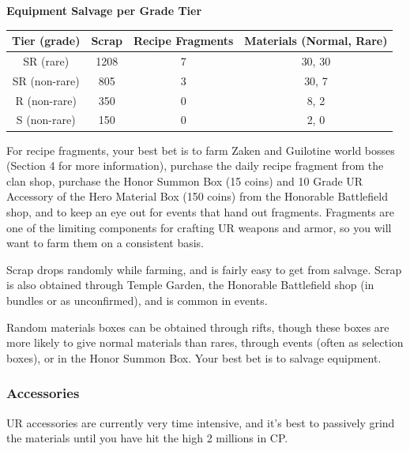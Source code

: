 \documentclass[]{article}
\begin{document}
\begin{center}
	\textbf{Equipment Salvage per Grade Tier}\\
	\begin{tabular}{|c|c|c|c|}
		\hline 
		Tier (grade) & Scrap & Recipe Fragments & Materials (Normal, Rare) \\ 
		\hline 
		SR (rare) & 1208 & 7 & 30, 30 \\ 
		SR (non-rare) & 805 & 3 & 30, 7 \\ 
		R (non-rare) & 350 & 0 & 8, 2 \\ 
		S (non-rare) & 150 & 0 & 2, 0 \\ 
		\hline 
	\end{tabular} 
\end{center}

For recipe fragments, your best bet is to farm Zaken and Guilotine world bosses (Section 4 for more information), purchase the daily recipe fragment from the clan shop, purchase the Honor Summon Box (15 coins) and 10 Grade UR Accessory of the Hero Material Box (150 coins) from the Honorable Battlefield shop, and to keep an eye out for events that hand out fragments.
Fragments are one of the limiting components for crafting UR weapons and armor, so you will want to farm them on a consistent basis.

Scrap drops randomly while farming, and is fairly easy to get from salvage.
Scrap is also obtained through Temple Garden, the Honorable Battlefield shop (in bundles or as unconfirmed), and is common in events.

Random materials boxes can be obtained through rifts, though these boxes are more likely to give normal materials than rares, through events (often as selection boxes), or in the Honor Summon Box.
Your best bet is to salvage equipment.

\subsubsection{Accessories}

UR accessories are currently very time intensive, and it's best to passively grind the materials until you have hit the high 2 millions in CP.
\end{document}
